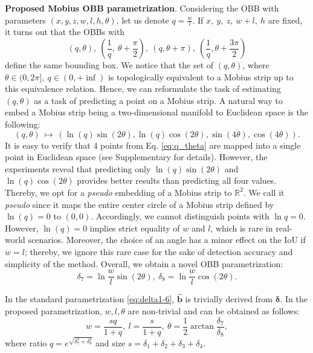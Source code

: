 \documentclass[runningheads]{llncs}
\begin{document}
\textbf{Proposed Mobius OBB parametrization}. Considering the OBB with parameters $(x, y, z, w, l, h, \theta)$, let us denote $q=\frac{w}{l}$. If $x,\ y,\ z,\ w + l,\ h$ are fixed, it turns out that the OBBs with 
\begin{equation}\label{eq:q_theta}
    \left( q, \theta \right),\ \left( \frac{1}{q},\ \theta+\frac{\pi}{2} \right),\ \left( q, \theta+\pi \right),\ \left( \frac{1}{q}, \theta+\frac{3\pi}{2} \right)
\end{equation}
define the same bounding box.
We notice that the set of $(q, \theta)$, where $\theta \in ( 0, 2\pi ], \ q \in (0, +\inf)$ is topologically equivalent to a Mobius strip \cite{munkres2000topology} up to this equivalence relation. Hence, we can reformulate the task of estimating $(q, \theta)$ as a task of predicting a point on a Mobius strip. A natural way to embed a Mobius strip being a two-dimensional manifold to Euclidean space is the following: 
\begin{equation} \label{eq:embedding}
    (q, \theta)\ \mapsto\ ( \ln(q) \sin(2\theta), \ln(q) \cos(2\theta), \sin(4\theta), \cos(4\theta)).
\end{equation}
It is easy to verify that 4 points from Eq. \ref{eq:q_theta} are mapped into a single point in Euclidean space (see Supplementary for details). 
However, the experiments reveal that predicting only $\ln(q) \sin(2\theta)$ and $\ln(q) \cos(2\theta)$ provides better results than predicting all four values. Thereby, we opt for a \textit{pseudo} embedding of a Mobius strip to $\mathbb{R}^2$. We call it \textit{pseudo} since it maps the entire center circle of a Mobius strip defined by $\ln(q)=0$ to $(0, 0)$. Accordingly, we cannot distinguish points with $\ln q=0$. However, $\ln(q)=0$ implies strict equality of $w$ and $l$, which is rare in real-world scenarios. Moreover, the choice of an angle has a minor effect on the IoU if $w = l$; thereby, we ignore this rare case for the sake of detection accuracy and simplicity of the method. Overall, we obtain a novel OBB parametrization: 
\begin{equation}\label{eq:delta7-8}
    \delta_7=\ln\frac{w}{l}\sin(2\theta),\ \delta_8=\ln\frac{w}{l}\cos(2\theta).
\end{equation}

In the standard parametrization \ref{eq:delta1-6}, $\hat{\boldsymbol{b}}$ is trivially derived from $\boldsymbol{\delta}$. In the proposed parametrization, $w, l, \theta$ are non-trivial and can be obtained as follows:
\begin{equation}
    w=\frac{sq}{1+q},\ l=\frac{s}{1+q},\ \theta=\frac{1}{2}\arctan{\frac{\delta_7}{\delta_8}},
\end{equation}
where ratio $q=e^{\sqrt{\delta_7^2+\delta_8^2}}$ and size $s=\delta_1+\delta_2+\delta_3+\delta_4$.
\end{document}
